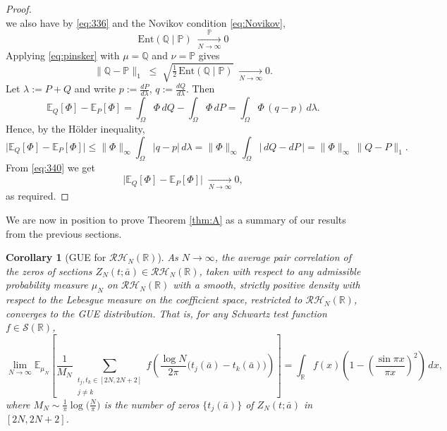 \documentclass[12pt,reqno]{amsart}
\theoremstyle{plain}
\newtheorem{cor}[prop]{Corollary}
\theoremstyle{definition}
\theoremstyle{remark}
\begin{document}
\begin{proof}
\begin{equation}
\end{equation} 
we also have by \eqref{eq:336} and the Novikov condition \eqref{eq:Novikov},
\begin{equation}
\mathrm{Ent}(\mathbb Q \!\mid\! \mathbb P) \;\xrightarrow[N\to\infty]{\ \ \mathbb{P}\ \ } 0   
\end{equation}
Applying \eqref{eq:pinsker} with $\mu=\mathbb Q$ and $\nu=\mathbb P$ gives
\begin{equation}
\label{eq:340}
\|\mathbb Q-\mathbb P\|_{1}
\;\le\; \sqrt{\tfrac12\,\mathrm{Ent}(\mathbb Q\!\mid\!\mathbb P)}
\;\xrightarrow[N\to\infty]{} 0.
\end{equation}
Let $\lambda:=P+Q$ and write
$p:=\frac{dP}{d\lambda}$, $q:=\frac{dQ}{d\lambda}$. Then
\begin{equation}
\mathbb{E}_Q[\Phi]-\mathbb{E}_P[\Phi]
= \int_\Omega \Phi\,dQ - \int_\Omega \Phi\,dP
= \int_\Omega \Phi\,(q-p)\,d\lambda .
\end{equation}
Hence, by the Hölder inequality,
\begin{equation}
\bigl|\mathbb{E}_Q[\Phi]-\mathbb{E}_P[\Phi]\bigr|
\le \|\Phi\|_\infty \int_\Omega |q-p|\,d\lambda
= \|\Phi\|_\infty \int_\Omega |\,dQ-dP\,|
= \|\Phi\|_\infty\,\|Q-P\|_{1}.
\end{equation}
From \eqref{eq:340} we get 
\begin{equation}
\bigl|\mathbb{E}_Q[\Phi]-\mathbb{E}_P[\Phi]\bigr|
\;\xrightarrow[N\to\infty]{} 0,
\end{equation}
as required. 
\end{proof}

We are now in position to prove Theorem \ref{thm:A} as a summary of our results from the previous sections. 

\begin{cor}[GUE for $\mathcal{RH}_N(\mathbb{R})$]\label{cor:A}
As \(N \to \infty\), the average pair
correlation of the zeros of sections 
\(Z_N(t;\bar a) \in \mathcal{RH}_N(\mathbb{R})\), taken with respect to 
any admissible probability measure $\mu_N$ on
$\mathcal{RH}_N(\mathbb{R})$ with a smooth, strictly positive density
with respect to the Lebesgue measure on the coefficient space, restricted
to $\mathcal{RH}_N(\mathbb{R})$, converges to the GUE distribution. That is, for any Schwartz test 
function \(f \in \mathcal{S}(\mathbb{R})\),
\begin{equation}\label{eq:GUE-ensemble}
\lim_{N\to\infty}
\mathbb{E}_{\mu_N}\!\left[
\frac{1}{M_N}
\sum_{\substack{t_j,t_k\in[2N,2N+2]\\ j\ne k}}
f\!\left(\frac{\log N}{2\pi}\bigl(t_j(\bar a)-t_k(\bar a)\bigr)\right)
\right]
=
\int_{\mathbb{R}} f(x)
\left(1-\left(\frac{\sin\pi x}{\pi x}\right)^2\right)\,dx,
\end{equation}
where \(M_N \sim \tfrac{1}{\pi}\log\!\bigl(\tfrac{N}{\pi}\bigr)\) is the 
number of zeros \(\{t_j(\bar a)\}\) of \(Z_N(t;\bar a)\) in \([2N,2N+2]\).
\end{cor}
\end{document}
